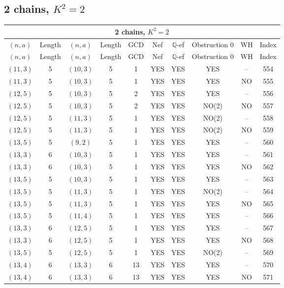 \subsection{2 chains, $K^2 = 2$}
\begin{longtable}{|c|c|c|c|c|c|c|c|c|c|}
\hline
\multicolumn{10}{|c|}{2 chains, $K^2 = 2$}\\
\hline
$(n,a)$ & Length & $(n,a)$ & Length & GCD & Nef & $\mathbb Q$-ef & Obstruction 0 & WH & Index\\
\hline
\endfirsthead

\hline
$(n,a)$ & Length & $(n,a)$ & Length & GCD & Nef & $\mathbb Q$-ef & Obstruction 0 & WH & Index\\
\hline
\endhead
\hline
\endfoot

$(11, 3)$ & 5 & $(10, 3)$ & 5 & 1 & YES & YES & YES & -- & 554\\
$(11, 3)$ & 5 & $(10, 3)$ & 5 & 1 & YES & YES & YES & NO & 555\\
$(12, 5)$ & 5 & $(10, 3)$ & 5 & 2 & YES & YES & YES & -- & 556\\
$(12, 5)$ & 5 & $(10, 3)$ & 5 & 2 & YES & YES & NO(2) & NO & 557\\
$(12, 5)$ & 5 & $(11, 3)$ & 5 & 1 & YES & YES & NO(2) & -- & 558\\
$(12, 5)$ & 5 & $(11, 3)$ & 5 & 1 & YES & YES & NO(2) & NO & 559\\
$(13, 5)$ & 5 & $(9, 2)$ & 5 & 1 & YES & YES & YES & -- & 560\\
$(13, 3)$ & 6 & $(10, 3)$ & 5 & 1 & YES & YES & YES & -- & 561\\
$(13, 3)$ & 6 & $(10, 3)$ & 5 & 1 & YES & YES & YES & NO & 562\\
$(13, 5)$ & 5 & $(10, 3)$ & 5 & 1 & YES & YES & YES & -- & 563\\
$(13, 5)$ & 5 & $(11, 3)$ & 5 & 1 & YES & YES & NO(2) & -- & 564\\
$(13, 5)$ & 5 & $(11, 3)$ & 5 & 1 & YES & YES & YES & NO & 565\\
$(13, 5)$ & 5 & $(11, 4)$ & 5 & 1 & YES & YES & YES & -- & 566\\
$(13, 3)$ & 6 & $(12, 5)$ & 5 & 1 & YES & YES & YES & -- & 567\\
$(13, 3)$ & 6 & $(12, 5)$ & 5 & 1 & YES & YES & YES & NO & 568\\
$(13, 5)$ & 5 & $(12, 5)$ & 5 & 1 & YES & YES & NO(2) & -- & 569\\
$(13, 4)$ & 6 & $(13, 3)$ & 6 & 13 & YES & YES & YES & -- & 570\\
$(13, 4)$ & 6 & $(13, 3)$ & 6 & 13 & YES & YES & YES & NO & 571\\

\end{longtable}
